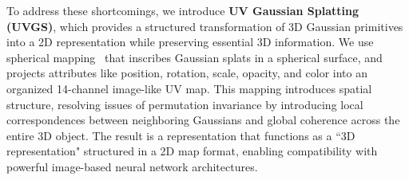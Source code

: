 

To address these shortcomings, we introduce \textbf{UV Gaussian Splatting (UVGS)}, which provides a structured transformation of 3D Gaussian primitives into a 2D representation while preserving essential 3D information. 
We use spherical mapping~\cite{sphericalmapping2006} that inscribes Gaussian splats in a spherical surface, and projects attributes like position, rotation, scale, opacity, and color into an organized 14-channel image-like UV map.
This mapping introduces spatial structure, resolving issues of permutation invariance by introducing local correspondences between neighboring Gaussians and global coherence across the entire 3D object. 
The result is a representation that functions as a ``3D representation" structured in a 2D map format, enabling compatibility with powerful image-based neural network architectures.


